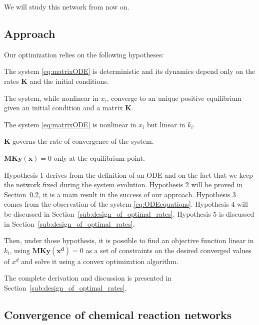         We will study this network from now on.

    \subsection{Approach} %
    \label{sub:approach}
        Our optimization relies on the following hypotheses:

        \begin{my_enumerate}
            \item The system \eqref{eq:matrixODE} is deterministic and its dynamics depend only on the rates $\mathbf{K}$ and the initial conditions.
            \item The system, while nonlinear in $x_i$, converge to an unique positive equilibrium given an initial condition and a matrix $\mathbf{K}$.
            \item The system \eqref{eq:matrixODE} is nonlinear in $x_i$ but linear in $k_i$.
            \item $\mathbf{K}$ governs the rate of convergence of the system.
            \item $\mathbf{M}\mathbf{K}\mathbf{y}(\mathbf{x}) = 0$ only at the equilibrium point.
        \end{my_enumerate}

        Hypothesis 1 derives from the definition of an ODE and on the fact that we keep the network fixed during the system evolution. Hypothesis 2 will be proved in Section~\ref{sub:convergence_of_chemical_reaction_networks}, it is a main result in the success of our approach. Hypothesis 3 comes from the observation of the system \eqref{eq:ODEequations}. Hypothesis 4 will be discussed in Section~\ref{sub:design_of_optimal_rates}. Hypothesis 5 is discussed in Section~\ref{sub:design_of_optimal_rates}.

        Then, under those hypothesis, it is possible to find an objective function linear in $k_i$, using $\mathbf{M}\mathbf{K}\mathbf{y}(\mathbf{x^d}) = 0$ as a set of constraints on the desired converged values of $x^d$ and solve it using a convex optimization algorithm.

        The complete derivation and discussion is presented in Section~\ref{sub:design_of_optimal_rates}.


    \subsection{Convergence of chemical reaction networks} %
    \label{sub:convergence_of_chemical_reaction_networks}

